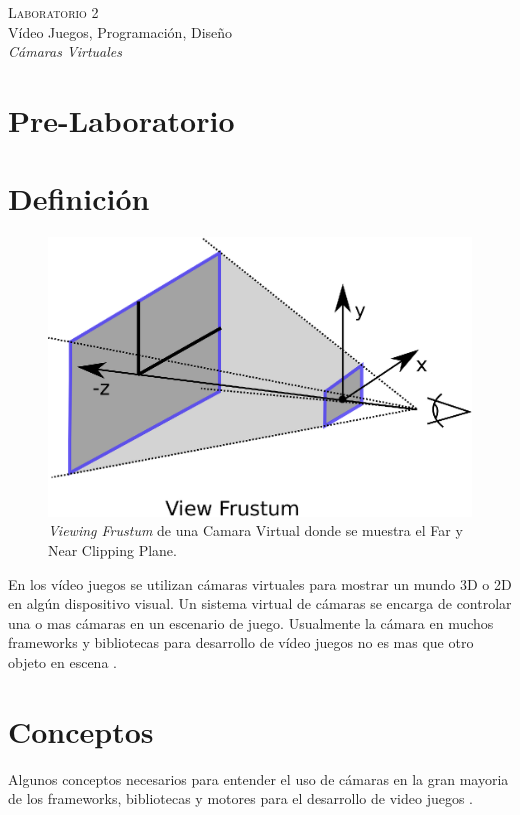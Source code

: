 \begin{center}
\textsc{\Large Laboratorio 2}~\\
{\large Vídeo Juegos, Programación, Diseño}~\\
\emph{Cámaras Virtuales}
\end{center}

\section{Pre-Laboratorio}
\section{Definición}
\begin{figure}
\includegraphics[width=\linewidth]{semana2/frustum.eps}
\caption{\emph{Viewing Frustum} de una Camara Virtual \cite{microsoft_frustum} donde se muestra el Far y Near Clipping Plane.}
\label{fig:frustum}
\end{figure}
En los vídeo juegos se utilizan cámaras virtuales para mostrar un mundo 3D o 2D en algún dispositivo visual. Un sistema virtual de cámaras se encarga de controlar una o mas cámaras en un escenario de juego. Usualmente la cámara en muchos frameworks y bibliotecas para desarrollo de vídeo juegos no es mas que otro objeto en escena \cite{fund_gamedesign}.
\newpage
\section{Conceptos}
Algunos conceptos necesarios para entender el uso de cámaras en la gran mayoria de los frameworks, bibliotecas y motores para el desarrollo de video juegos \cite{unity_camera}.
